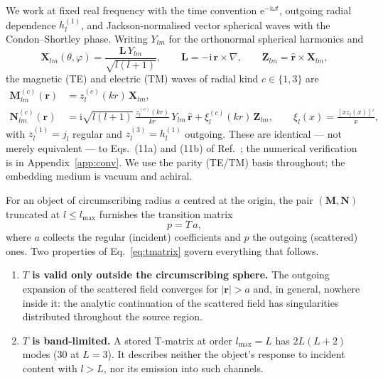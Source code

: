 \documentclass[11pt,a4paper]{article}
\newcommand{\lmax}{\ensuremath{l_{\max}}}
\newcommand{\rvec}{\ensuremath{\mathbf{r}}}
\theoremstyle{plain}
\theoremstyle{definition}
\begin{document}
We work at fixed real frequency with the time convention
$\mathrm{e}^{-\mathrm{i}\omega t}$, outgoing radial dependence
$h^{(1)}_l$, and Jackson-normalised vector spherical waves with the
Condon--Shortley phase. Writing $Y_{lm}$ for the orthonormal spherical harmonics
and
\begin{equation}
  \mathbf{X}_{lm}(\theta,\varphi) = \frac{\mathbf{L}\,Y_{lm}}{\sqrt{l(l+1)}},
  \qquad
  \mathbf{L} = -\mathrm{i}\,\rvec\times\nabla,
  \qquad
  \mathbf{Z}_{lm} = \hat{\rvec}\times\mathbf{X}_{lm},
\end{equation}
the magnetic (TE) and electric (TM) waves of radial kind $c \in \{1,3\}$ are
\begin{align}
  \mathbf{M}^{(c)}_{lm}(\rvec)
    &= z^{(c)}_l(kr)\,\mathbf{X}_{lm},
  \label{eq:Mwave}\\
  \mathbf{N}^{(c)}_{lm}(\rvec)
    &= \mathrm{i}\sqrt{l(l+1)}\,\frac{z^{(c)}_l(kr)}{kr}\,Y_{lm}\,\hat{\rvec}
     + \xi^{(c)}_l(kr)\,\mathbf{Z}_{lm},
  \qquad
  \xi_l(x) = \frac{[x z_l(x)]'}{x},
  \label{eq:Nwave}
\end{align}
with $z^{(1)}_l = j_l$ regular and $z^{(3)}_l = h^{(1)}_l$ outgoing. These are
identical --- not merely equivalent --- to Eqs.~(11a) and (11b) of
Ref.~\cite{beutel2024}; the numerical verification is in
Appendix~\ref{app:conv}. We use the parity (TE/TM) basis throughout; the
embedding medium is vacuum and achiral.

For an object of circumscribing radius $a$ centred at the origin, the pair
$(\mathbf{M},\mathbf{N})$ truncated at $l \le \lmax$ furnishes the transition
matrix
\begin{equation}
  p = T\,a ,
  \label{eq:tmatrix}
\end{equation}
where $a$ collects the regular (incident) coefficients and $p$ the outgoing
(scattered) ones. Two properties of Eq.~\eqref{eq:tmatrix} govern everything
that follows.

\begin{enumerate}[label=(\roman*),leftmargin=*,itemsep=2pt]
\item \textbf{$T$ is valid only outside the circumscribing sphere.} The outgoing
      expansion of the scattered field converges for $|\rvec| > a$ and, in
      general, nowhere inside it: the analytic continuation of the scattered
      field has singularities distributed throughout the source region.
\item \textbf{$T$ is band-limited.} A stored T-matrix at order $\lmax = L$ has
      $2L(L+2)$ modes ($30$ at $L = 3$). It describes neither the object's
      response to incident content with $l > L$, nor its emission into such
      channels.
\end{enumerate}
\end{document}
